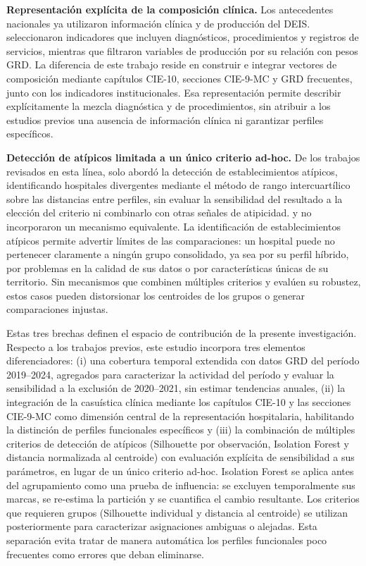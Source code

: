 \textbf{Representación explícita de la composición clínica.} Los antecedentes
nacionales ya utilizaron información clínica y de producción del DEIS.
\citet{Carlier2020} seleccionaron indicadores que incluyen diagnósticos,
procedimientos y registros de servicios, mientras que \citet{Giglio2021}
filtraron variables de producción por su relación con pesos GRD. La diferencia
de este trabajo reside en construir e integrar vectores de composición mediante
capítulos CIE-10, secciones CIE-9-MC y GRD frecuentes, junto con los indicadores
institucionales. Esa representación permite describir explícitamente la mezcla
diagnóstica y de procedimientos, sin atribuir a los estudios previos una
ausencia de información clínica ni garantizar perfiles específicos.

\textbf{Detección de atípicos limitada a un único criterio ad-hoc.} De los
trabajos revisados en esta línea, solo \citet{Villalobos2016} abordó la
detección de establecimientos atípicos, identificando hospitales divergentes
mediante el método de rango intercuartílico sobre las distancias entre
perfiles, sin evaluar la sensibilidad del resultado a la elección del
criterio ni combinarlo con otras señales de atipicidad. \citet{Carlier2020} y
\citet{Giglio2021} no incorporaron un mecanismo equivalente. La identificación de
establecimientos atípicos permite advertir límites de las comparaciones: un hospital puede no pertenecer
claramente a ningún grupo consolidado, ya sea por su perfil híbrido, por
problemas en la calidad de sus datos o por características únicas de su
territorio. Sin mecanismos que combinen múltiples criterios y evalúen su
robustez, estos casos pueden distorsionar los centroides de los grupos o
generar comparaciones injustas.

Estas tres brechas definen el espacio de contribución de la presente
investigación. Respecto a los trabajos previos, este estudio incorpora tres
elementos diferenciadores: (i) una cobertura temporal extendida con datos GRD
del período 2019--2024, agregados para caracterizar la actividad del período y evaluar la sensibilidad
a la exclusión de 2020--2021, sin estimar tendencias anuales, (ii) la integración de la casuística clínica mediante los capítulos
CIE-10 y las secciones CIE-9-MC como dimensión central de la representación
hospitalaria, habilitando la distinción de perfiles funcionales específicos y
(iii) la combinación de múltiples criterios de detección de atípicos
(Silhouette por observación, Isolation Forest y distancia normalizada al
centroide) con evaluación explícita de sensibilidad a sus parámetros, en
lugar de un único criterio ad-hoc. Isolation Forest se aplica antes del
agrupamiento como una prueba de influencia: se excluyen temporalmente sus marcas,
se re-estima la partición y se cuantifica el cambio resultante. Los criterios que
requieren grupos (Silhouette individual y distancia al centroide) se utilizan
posteriormente para caracterizar asignaciones ambiguas o alejadas. Esta
separación evita tratar de manera automática los perfiles funcionales poco
frecuentes como errores que deban eliminarse.


